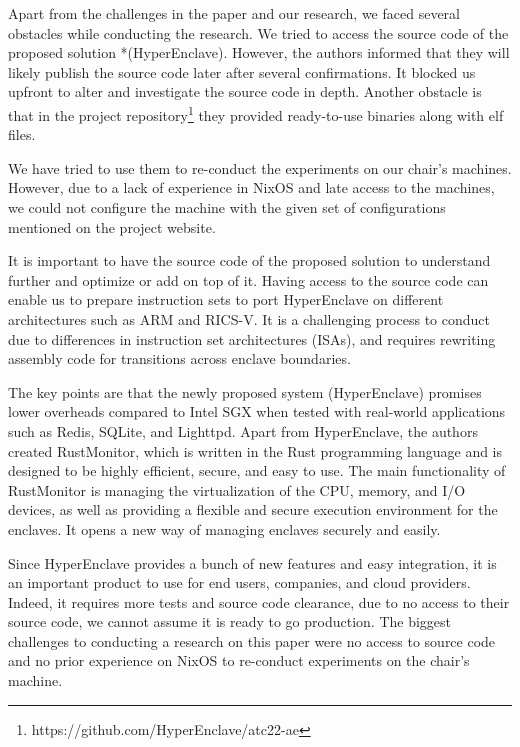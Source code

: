 Apart from the challenges in the paper and our research, we faced several obstacles while conducting the research.  We tried to access the source code of the proposed solution *(HyperEnclave). However, the authors informed that they will likely publish the source code later after several confirmations. It blocked us upfront to alter and investigate the source code in depth.
Another obstacle is that in the project repository\footnote{https://github.com/HyperEnclave/atc22-ae} they provided ready-to-use binaries along with elf files.

We have tried to use them to re-conduct the experiments on our chair's machines. However, due to a lack of experience in NixOS and late access to the machines, we could not configure the machine with the given set of configurations mentioned on the project website. 

It is important to have the source code of the proposed solution to understand further and optimize or add on top of it. Having access to the source code can enable us to prepare instruction sets to port HyperEnclave on different architectures such as ARM and RICS-V. It is a challenging process to conduct due to differences in instruction set architectures (ISAs), and requires rewriting assembly code for transitions across enclave boundaries. 


The key points are that the newly proposed system (HyperEnclave) promises lower overheads compared to Intel SGX when tested with real-world applications such as Redis, SQLite, and Lighttpd. Apart from HyperEnclave, the authors created RustMonitor, which is written in the Rust programming language and is designed to be highly efficient, secure, and easy to use.  The main functionality of RustMonitor is managing the virtualization of the CPU, memory, and I/O devices, as well as providing a flexible and secure execution environment for the enclaves. It opens a new way of managing enclaves securely and easily. 

Since HyperEnclave provides a bunch of new features and easy integration, it is an important product to use for end users, companies, and cloud providers. Indeed, it requires more tests and source code clearance, due to no access to their source code, we cannot assume it is ready to go production. The biggest challenges to conducting a research on this paper were no access to source code and no prior experience on NixOS to re-conduct experiments on the chair's machine.



